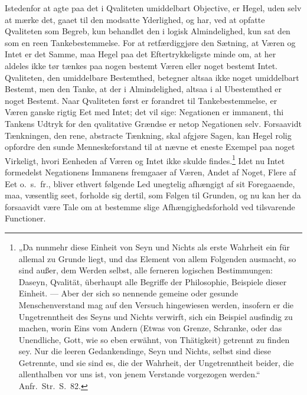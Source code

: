 \documentclass[12pt]{book}
\newcommand{\opage}[1]{\marginnote{\footnotesize\textit{[#1]}}}
\begin{document}
Istedenfor at agte paa det i Qvaliteten umiddelbart Objective, er Hegel, uden selv at mærke det, gaaet
til den modsatte Yderlighed, og har, ved at opfatte Qvaliteten som Begreb, kun behandlet den i logisk
Almindelighed, kun sat den som en reen Tankebestemmelse. For at retfærdiggjøre den Sætning, at Væren og
Intet er det Samme, maa Hegel paa det Eftertrykkeligste minde om, at her aldeles ikke tør tænkes paa
nogen bestemt Væren eller noget bestemt Intet. Qvaliteten, den umiddelbare Bestemthed, betegner altsaa
ikke noget umiddelbart Bestemt, men den Tanke, at der i Almindelighed, altsaa i al Ubestemthed er noget
Bestemt. Naar Qvaliteten først er forandret til Tankebestemmelse, er Væren ganske rigtig Eet med Intet;
det vil sige: Negationen er immanent, thi Tankens Udtryk for den qvalitative Grændse er
\opage{290} netop Negationen selv. Forsaavidt Tænkningen, den rene, abstracte Tænkning, skal afgjøre Sagen, kan
Hegel rolig opfordre den sunde Menneskeforstand til at nævne et eneste Exempel paa noget Virkeligt,
hvori Eenheden af Væren og Intet ikke skulde findes.\footnote{„Da nunmehr diese Einheit von Seyn und
Nichts als erste Wahrheit ein für allemal zu Grunde liegt, und das Element von allem Folgenden
ausmacht, so sind außer, dem Werden selbst, alle ferneren logischen Bestimmungen: Daseyn, Qvalität,
überhaupt alle Begriffe der Philosophie, Beispiele dieser Einheit. --- Aber der sich so nennende
gemeine oder gesunde Menschenverstand mag auf den Versuch hingewiesen werden, insofern er die
Ungetrenntheit des Seyns und Nichts verwirft, sich ein Beispiel ausfindig zu machen, worin Eins vom
Andern (Etwas von Grenze, Schranke, oder das Unendliche, Gott, wie so eben erwähnt, von Thätigkeit)
getrennt zu finden sey. Nur die leeren Gedankendinge, Seyn und Nichts, selbst sind diese Getrennte, und
sie sind es, die der Wahrheit, der Ungetrenntheit beider, die allenthalben vor uns ist, von jenem
Verstande vorgezogen werden.“ Anfr.\ Str.\ S.~82.}
Idet nu Intet formedelst Negationens Immanens fremgaaer af Væren, Andet af Noget, Flere af Eet
o.\ s.\ fr., bliver ethvert følgende Led unegtelig afhængigt af sit Foregaaende, maa, væsentlig seet,
forholde sig dertil, som Følgen til Grunden, og nu kan her da forsaavidt være Tale om at bestemme slige
Afhængighedsforhold ved tilsvarende Functioner.
\end{document}
